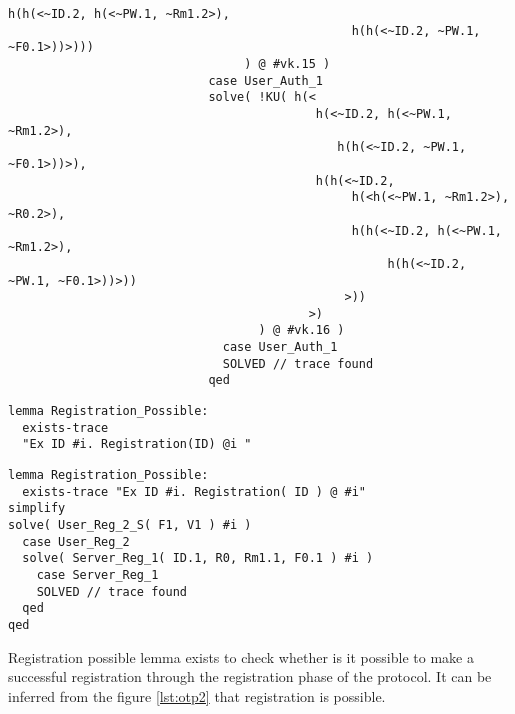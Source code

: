 \documentclass[a4paper, 12pt, titlepage]{article}
\begin{document}
\begin{lstlisting}[caption = Execution results are positive for authentication possible lemma of One Time Password Scheme]
                                           h(h(<~ID.2, h(<~PW.1, ~Rm1.2>),
                                                h(h(<~ID.2, ~PW.1, ~F0.1>))>)))
                                 ) @ #vk.15 )
                            case User_Auth_1
                            solve( !KU( h(<
                                           h(<~ID.2, h(<~PW.1, ~Rm1.2>),
                                              h(h(<~ID.2, ~PW.1, ~F0.1>))>),
                                           h(h(<~ID.2,
                                                h(<h(<~PW.1, ~Rm1.2>), ~R0.2>),
                                                h(h(<~ID.2, h(<~PW.1, ~Rm1.2>),
                                                     h(h(<~ID.2, ~PW.1, ~F0.1>))>))
                                               >))
                                          >)
                                   ) @ #vk.16 )
                              case User_Auth_1
                              SOLVED // trace found
                            qed
\end{lstlisting}
\begin{lstlisting}[caption = Implementation of registration possible lemma of One Time Password Scheme]
lemma Registration_Possible:
  exists-trace
  "Ex ID #i. Registration(ID) @i "
\end{lstlisting}
\begin{lstlisting}[caption = Execution results are positive for registration possible lemma of One Time Password Scheme,
label = {lst:otp2}]
lemma Registration_Possible:
  exists-trace "Ex ID #i. Registration( ID ) @ #i"
simplify
solve( User_Reg_2_S( F1, V1 ) #i )
  case User_Reg_2
  solve( Server_Reg_1( ID.1, R0, Rm1.1, F0.1 ) #i )
    case Server_Reg_1
    SOLVED // trace found
  qed
qed
\end{lstlisting}
Registration possible lemma exists to check whether is it possible to make a successful registration through the registration phase of the protocol. It can be inferred from the figure \ref{lst:otp2} that registration is possible.
\newpage
\end{document}
